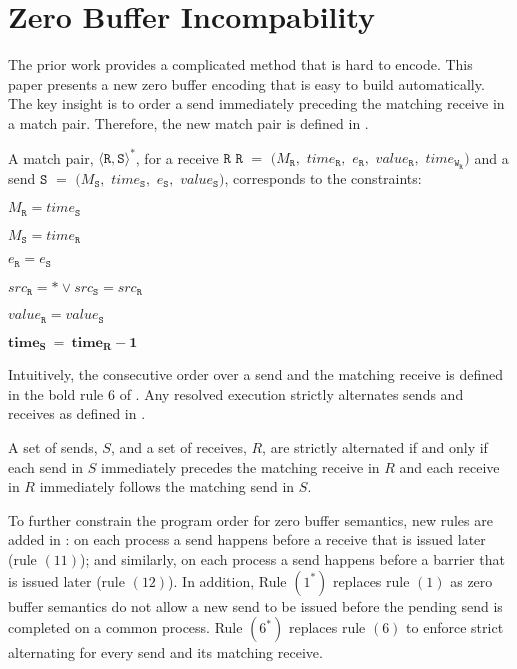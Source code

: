 \section{Zero Buffer Incompability}
The prior work provides a complicated method that is hard to encode. This paper presents a new zero buffer encoding that is easy to build automatically. 
The key insight is to order a send immediately preceding the matching receive in a match pair. Therefore, the new match pair is defined in .

\begin{definition} \label{def:match*}
A match pair, $\langle\mathtt{R}, \mathtt{S}\rangle^*$, for a receive
$\mathtt{R}$ $\mathtt{R}$ $=$ $(M_\mathtt{R},$ $\mathit{time}_\mathtt{R},$ $e_\mathtt{R},$ $\mathit{value}_\mathtt{R},$ $\mathit{time}_{\mathtt{W}_\mathtt{R}})$ and a send $\mathtt{S}$ $=$ $(M_\mathtt{S},$ $\mathit{time}_\mathtt{S},$ $e_\mathtt{S},$ $\mathit{value}_\mathtt{S})$, corresponds to the constraints:
\begin{compactenum}
\item $M_{\mathtt{R}} = \mathit{time}_{\mathtt{S}}$
\item $M_{\mathtt{S}} = \mathit{time}_{\mathtt{R}}$
\item $e_{\mathtt{R}} = e_{\mathtt{S}}$
\item $src_\mathtt{R} = \ast \vee src_\mathtt{S} = src_\mathtt{R}$
\item $\mathit{value}_{\mathtt{R}} = \mathit{value}_{\mathtt{S}}$ 
\item $\mathit{\textbf{time}}_{\mathtt{\textbf{S}}}\ = \ \mathit{\textbf{time}}_{\mathtt{\textbf{R}}} - \mathit{\textbf{1}}$
\end{compactenum}
\end{definition}

Intuitively, the consecutive order over a send and the matching receive is defined in the bold rule $6$ of . Any resolved execution strictly alternates sends and receives as defined in .

\begin{definition}\label{def:alternate}
A set of sends, $S$, and a set of receives, $R$, are strictly alternated if and only if each send in $S$ immediately precedes the matching receive in $R$ and each receive in $R$ immediately follows the matching send in $S$.
\end{definition}
To further constrain the program order for zero buffer semantics, new rules are added in : on each process a send happens before a receive that is issued later (rule $(11)$); and similarly, on each process a send happens before a barrier that is issued later (rule $(12)$). In addition, Rule $(1^*)$ replaces rule $(1)$ as zero buffer semantics do not allow a new send to be issued before the pending send is completed on a common process. Rule $(6^*)$ replaces rule $(6)$ to enforce strict alternating for every send and its matching receive.


